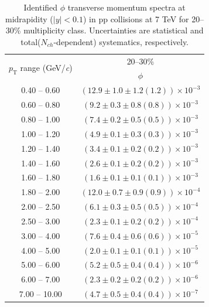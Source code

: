 \begin{table}
\caption{Identified $\phi$ transverse momentum spectra at midrapidity ($|y|<0.1$) in pp collisions at 7 TeV for 20--30\% multiplicity class. Uncertainties are statistical and total($N_{ch}$-dependent) systematics, respectively.}
\label{tab:Phi_20to30}
\begin{center}
\begin{tabular}{ c | c }
\hline
\multirow{2}{*}{$p_{\mathrm{T}}$ range (GeV/\textit{c})} & \multicolumn{1}{c}{20--30\%} \\ & $\phi$\\ 
\hline
0.40 -- 0.60 & $(12.9\pm1.0\pm1.2(1.2))\times10^{-3}$ \\ 
0.60 -- 0.80 & $(9.2\pm0.3\pm0.8(0.8))\times10^{-3}$ \\ 
0.80 -- 1.00 & $(7.4\pm0.2\pm0.5(0.5))\times10^{-3}$ \\ 
1.00 -- 1.20 & $(4.9\pm0.1\pm0.3(0.3))\times10^{-3}$ \\ 
1.20 -- 1.40 & $(3.4\pm0.1\pm0.2(0.2))\times10^{-3}$ \\ 
1.40 -- 1.60 & $(2.6\pm0.1\pm0.2(0.2))\times10^{-3}$ \\ 
1.60 -- 1.80 & $(1.6\pm0.1\pm0.1(0.1))\times10^{-3}$ \\ 
1.80 -- 2.00 & $(12.0\pm0.7\pm0.9(0.9))\times10^{-4}$ \\ 
2.00 -- 2.50 & $(6.1\pm0.3\pm0.5(0.5))\times10^{-4}$ \\ 
2.50 -- 3.00 & $(2.3\pm0.1\pm0.2(0.2))\times10^{-4}$ \\ 
3.00 -- 4.00 & $(7.6\pm0.4\pm0.6(0.6))\times10^{-5}$ \\ 
4.00 -- 5.00 & $(2.0\pm0.1\pm0.1(0.1))\times10^{-5}$ \\ 
5.00 -- 6.00 & $(5.2\pm0.5\pm0.4(0.4))\times10^{-6}$ \\ 
6.00 -- 7.00 & $(2.3\pm0.2\pm0.2(0.2))\times10^{-6}$ \\ 
7.00 -- 10.00 & $(4.7\pm0.5\pm0.4(0.4))\times10^{-7}$ \\ 
\hline
\end{tabular}
\end{center}
\end{table}
 
